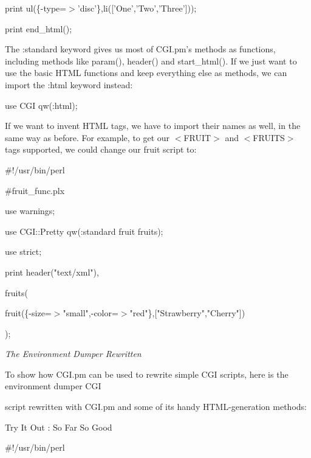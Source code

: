 \documentclass[a4paper,11pt]{book}
\begin{document}
\noindent print ul(\{-type=$>$'disc'\},li(['One','Two','Three']));

\noindent 

\noindent print end\_html();

\noindent 

\noindent The :standard keyword gives us most of CGI.pm's methods as functions, including methods like param(), header() and start\_html(). If we just want to use the basic HTML functions and keep everything else as methods, we can import the :html keyword instead:

\noindent 

\noindent 

\noindent use CGI qw(:html);

\noindent 

\noindent If we want to invent HTML tags, we have to import their names as well, in the same way as before. For example, to get our $<$FRUIT$>$ and $<$FRUITS$>$ tags supported, we could change our fruit script to:

\noindent 

\noindent 

\noindent \#!/usr/bin/perl

\noindent \#fruit\_func.plx

\noindent use warnings;

\noindent use CGI::Pretty qw(:standard fruit fruits);

\noindent use strict;

\noindent 

\noindent print header("text/xml"),

\noindent fruits(

\noindent fruit(\{-size=$>$"small",-color=$>$"red"\},["Strawberry","Cherry"])

\noindent );

\noindent 

\noindent \textit{The Environment Dumper Rewritten}

\noindent To show how CGI.pm can be used to rewrite simple CGI scripts, here is the environment dumper CGI

\noindent script rewritten with CGI.pm and some of its handy HTML-generation methods:

\noindent 

\noindent Try It Out : So Far So Good

\noindent 

\noindent 

\noindent \#!/usr/bin/perl
\end{document}
